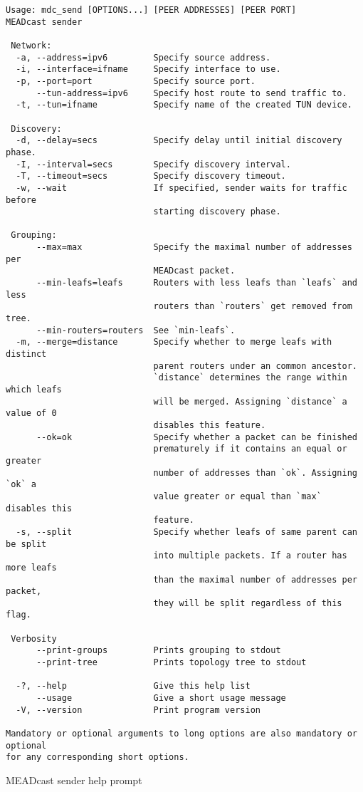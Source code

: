 \begin{listing}
\begin{verbatim}
Usage: mdc_send [OPTIONS...] [PEER ADDRESSES] [PEER PORT]
MEADcast sender

 Network:
  -a, --address=ipv6         Specify source address.
  -i, --interface=ifname     Specify interface to use.
  -p, --port=port            Specify source port.
      --tun-address=ipv6     Specify host route to send traffic to.
  -t, --tun=ifname           Specify name of the created TUN device.

 Discovery:
  -d, --delay=secs           Specify delay until initial discovery phase.
  -I, --interval=secs        Specify discovery interval.
  -T, --timeout=secs         Specify discovery timeout.
  -w, --wait                 If specified, sender waits for traffic before
                             starting discovery phase.

 Grouping:
      --max=max              Specify the maximal number of addresses per
                             MEADcast packet.
      --min-leafs=leafs      Routers with less leafs than `leafs` and less
                             routers than `routers` get removed from tree.
      --min-routers=routers  See `min-leafs`.
  -m, --merge=distance       Specify whether to merge leafs with distinct
                             parent routers under an common ancestor.
                             `distance` determines the range within which leafs
                             will be merged. Assigning `distance` a value of 0
                             disables this feature.
      --ok=ok                Specify whether a packet can be finished
                             prematurely if it contains an equal or greater
                             number of addresses than `ok`. Assigning `ok` a
                             value greater or equal than `max` disables this
                             feature.
  -s, --split                Specify whether leafs of same parent can be split
                             into multiple packets. If a router has more leafs
                             than the maximal number of addresses per packet,
                             they will be split regardless of this flag.

 Verbosity
      --print-groups         Prints grouping to stdout
      --print-tree           Prints topology tree to stdout

  -?, --help                 Give this help list
      --usage                Give a short usage message
  -V, --version              Print program version

Mandatory or optional arguments to long options are also mandatory or optional
for any corresponding short options.
\end{verbatim}
\caption{MEADcast sender help prompt}
\label{lst:send_help}
\end{listing}


